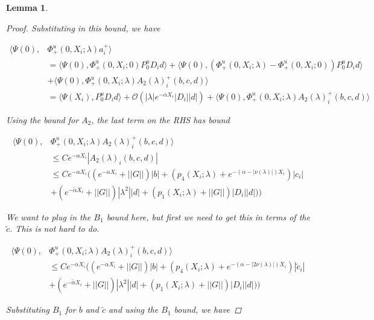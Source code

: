 \documentclass[12pt]{article}
\newtheorem{lemma}{Lemma}
\begin{document}
\begin{lemma}
\begin{proof}
Substituting in this bound, we have

\begin{align*}
\langle \Psi(0), &\Phi^u_+(0, X_i; \lambda) a_i^+ \rangle \\
&= \langle \Psi(0), \Phi^u_+(0, X_i; 0) P^u_0 D_i d \rangle + \langle \Psi(0), (\Phi^u_+(0, X_i; \lambda) - \Phi^u_+(0, X_i; 0)) P^u_0 D_i d \rangle \\
&+ \langle \Psi(0), \Phi^u_+(0, X_i; \lambda) A_2(\lambda)_i^+(b,c,d) \rangle \\
&= \langle \Psi(X_i), P^u_0 D_i d \rangle + \mathcal{O}(|\lambda| e^{-\alpha X_i}|D_i||d|) + \langle \Psi(0), \Phi^u_+(0, X_i; \lambda) A_2(\lambda)_i^+(b,c,d) \rangle 
\end{align*}

Using the bound for $A_2$, the last term on the RHS has bound

\begin{align*}
\langle \Psi(0), &\Phi^u_+(0, X_i; \lambda) A_2(\lambda)_i^+(b,c,d) \rangle \\
&\leq C e^{-\alpha X_i} |A_2(\lambda)_i(b,c,d)| \\
&\leq C e^{-\alpha X_i}  \Big( (e^{-\alpha X_i} + ||G||)|b| + ( p_4(X_i; \lambda) + e^{-(\alpha - |\nu(\lambda)|)X_i} )|c_i| \\
&+ (e^{-\tilde{\alpha} X_i} + ||G||) |\lambda^2| |d| +(p_1(X_i; \lambda) + ||G|| )|D_i||d|) \Big)
\end{align*}

We want to plug in the $B_1$ bound here, but first we need to get this in terms of the $\tilde{c}$. This is not hard to do.

\begin{align*}
\langle \Psi(0), &\Phi^u_+(0, X_i; \lambda) A_2(\lambda)_i^+(b,c,d) \rangle \\
&\leq C e^{-\alpha X_i} ( (e^{-\alpha X_i} + ||G||)|b| + ( p_4(X_i; \lambda) + e^{-(\alpha - |2 \nu(\lambda)|)X_i} )|\tilde{c}_i| \\
&+ (e^{-\tilde{\alpha} X_i} + ||G||) |\lambda^2| |d| +(p_1(X_i; \lambda) + ||G|| )|D_i||d|))
\end{align*}

Substituting $B_1$ for $b$ and $\tilde{c}$ and using the $B_1$ bound, we have


\end{proof}
\end{lemma}
\end{document}
